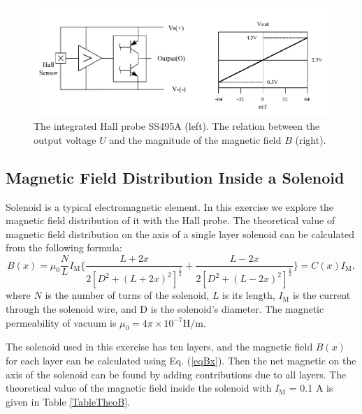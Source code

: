 \documentclass{article}
\begin{document}
\begin{figure}[H]
\centering
\includegraphics[scale=1.0]{circuit.png}
\caption{The integrated Hall probe SS495A (left). The relation between the output voltage $U$ and the magnitude of the magnetic field $B$ (right).}\label{FigCircuit}
\end{figure}

	\subsection{Magnetic Field Distribution Inside a Solenoid}
Solenoid is a typical electromagnetic element. In this exercise we explore the magnetic field distribution of it with the Hall probe. The theoretical value of magnetic field distribution on the axis of a single layer solenoid can be calculated from the following formula:
\begin{equation}\label{eqBx}
B(x) = \mu_0\frac{N}{L}I_\text{M}\{\frac{L+2x}{2[D^2+(L+2x)^2]^{\frac{1}{2}}}+\frac{L-2x}{2[D^2+(L-2x)^2]^{\frac{1}{2}}}\} = C(x)I_\text{M},
\end{equation}
where $N$ is the number of turns of the solenoid, $L$ is its length, $I_\text{M}$ is the current through the solenoid wire, and D is the solenoid’s diameter. The magnetic permeability of vacuum is $\mu_0 = 4\pi \times 10^{-7} \text{H}/\text{m}.$

The solenoid used in this exercise has ten layers, and the magnetic field $B(x)$ for each layer can be calculated using Eq. (\ref{eqBx}). Then the net magnetic on the axis of the solenoid can be found by adding contributions due to all layers. The theoretical value of the magnetic field inside the solenoid with $I_\text{M}$ = 0.1 A is given in Table \ref{TableTheoB}.
\end{document}
